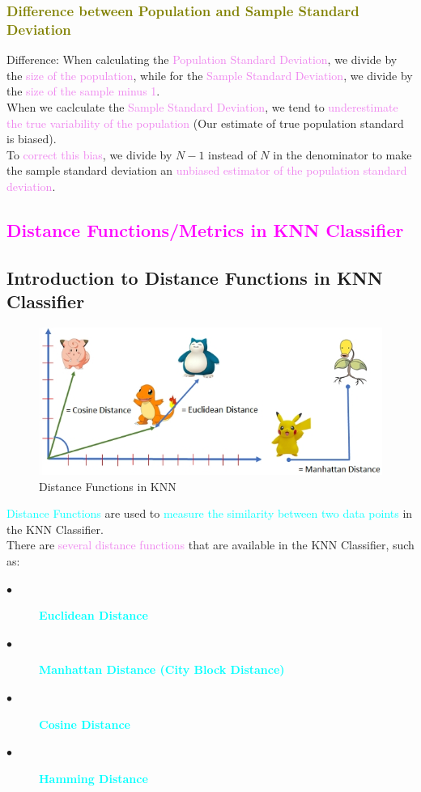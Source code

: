 \documentclass{book}
\begin{document}
\textcolor{olive}{\subsubsection{Difference between Population and Sample Standard Deviation}}
Difference: When calculating the \textcolor{violet}{Population Standard Deviation}, we divide by the \textcolor{violet}{size of the population}, while for the \textcolor{violet}{Sample Standard Deviation}, we divide by the \textcolor{violet}{size of the sample minus 1}.\\
When we caclculate the \textcolor{violet}{Sample Standard Deviation}, we tend to \textcolor{violet}{underestimate the true variability of the population }(Our estimate of true population standard is biased).\\
To \textcolor{violet}{correct this bias}, we divide by \(N-1\) instead of \(N\) in the denominator to make the sample standard deviation an \textcolor{violet}{unbiased estimator of the population standard deviation}.\\
\newpage
\textcolor{magenta}{\section{\textbf{Distance Functions/Metrics in KNN Classifier}}}

\subsection{Introduction to Distance Functions in KNN Classifier}
\begin{figure}
    \centering
    \includegraphics[scale=0.35]{chapter 4/ch4_figure2.jpeg}
    \caption{Distance Functions in KNN}
\end{figure}

\textcolor{cyan}{Distance Functions} are used to \textcolor{cyan}{measure the similarity between two data points} in the KNN Classifier.\\
There are \textcolor{violet}{several distance functions} that are available in the KNN Classifier, such as:
\begin{description}
    \item[$\bullet$] \textcolor{cyan}{\textbf{Euclidean Distance}}
    \item[$\bullet$] \textcolor{cyan}{\textbf{Manhattan Distance (City Block Distance)}}
    \item[$\bullet$] \textcolor{cyan}{\textbf{Cosine Distance}}
    \item[$\bullet$] \textcolor{cyan}{\textbf{Hamming Distance}}
\end{description}
\vspace{4mm}
\end{document}
